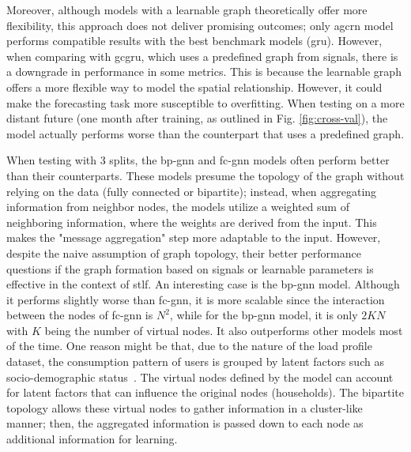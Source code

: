 Moreover, although models with a learnable graph theoretically offer more flexibility, this approach does not deliver promising outcomes; only \acrshort{agcrn} model performs compatible results with the best benchmark models (\acrshort{gru}). However, when comparing with \acrshort{gcgru}, which uses a predefined graph from signals, there is a downgrade in performance in some metrics. This is because the learnable graph offers a more flexible way to model the spatial relationship. However, it could make the forecasting task more susceptible to overfitting. When testing on a more distant future (one month after training, as outlined in Fig. \ref{fig:cross-val}), the model actually performs worse than the counterpart that uses a predefined graph. 

When testing with 3 splits, the \acrshort{bp-gnn} and \acrshort{fc-gnn} models often perform better than their counterparts. These models presume the topology of the graph without relying on the data (fully connected or bipartite); instead, when aggregating information from neighbor nodes, the models utilize a weighted sum of neighboring information, where the weights are derived from the input. This makes the "message aggregation" step more adaptable to the input. 
However, despite the naive assumption of graph topology, their better performance questions if the graph formation based on signals or learnable parameters is effective in the context of \acrshort{stlf}. 
An interesting case is the \acrshort{bp-gnn} model. Although it performs slightly worse than \acrshort{fc-gnn}, it is more scalable since the interaction between the nodes of \acrshort{fc-gnn} is $N^2$, while for the \acrshort{bp-gnn} model, it is only $2KN$ with $K$ being the number of virtual nodes. It also outperforms other models most of the time. One reason might be that, due to the nature of the load profile dataset, the consumption pattern of users is grouped by latent factors such as socio-demographic status~\cite{acorn}. The virtual nodes defined by the model can account for latent factors that can influence the original nodes (households). The bipartite topology allows these virtual nodes to gather information in a cluster-like manner; then, the aggregated information is passed down to each node as additional information for learning.





